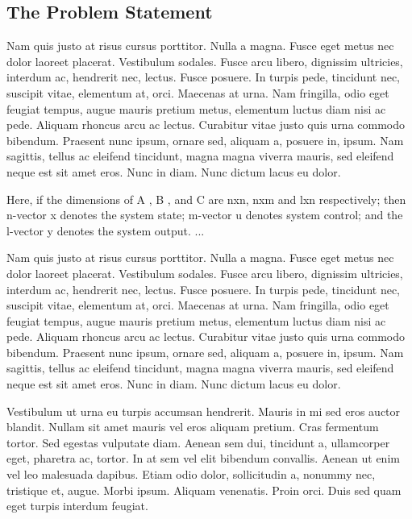 \subsection{The Problem Statement}    

Nam quis justo at risus cursus porttitor. Nulla a magna. Fusce eget metus nec dolor laoreet placerat. Vestibulum sodales. Fusce arcu libero, dignissim ultricies, interdum ac, hendrerit nec, lectus. Fusce posuere. In turpis pede, tincidunt nec, suscipit vitae, elementum at, orci. Maecenas at urna. Nam fringilla, odio eget feugiat tempus, augue mauris pretium metus, elementum luctus diam nisi ac pede. Aliquam rhoncus arcu ac lectus. Curabitur vitae justo quis urna commodo bibendum. Praesent nunc ipsum, ornare sed, aliquam a, posuere in, ipsum. Nam sagittis, tellus ac eleifend tincidunt, magna magna viverra mauris, sed eleifend neque est sit amet eros. Nunc in diam. Nunc dictum lacus eu dolor.

Here, if the dimensions of A  , B  , and C   are nxn, nxm and lxn   respectively; then n-vector x denotes the system state; m-vector u denotes system control; and the l-vector y denotes the system output. ... 

Nam quis justo at risus cursus porttitor. Nulla a magna. Fusce eget metus nec dolor laoreet placerat. Vestibulum sodales. Fusce arcu libero, dignissim ultricies, interdum ac, hendrerit nec, lectus. Fusce posuere. In turpis pede, tincidunt nec, suscipit vitae, elementum at, orci. Maecenas at urna. Nam fringilla, odio eget feugiat tempus, augue mauris pretium metus, elementum luctus diam nisi ac pede. Aliquam rhoncus arcu ac lectus. Curabitur vitae justo quis urna commodo bibendum. Praesent nunc ipsum, ornare sed, aliquam a, posuere in, ipsum. Nam sagittis, tellus ac eleifend tincidunt, magna magna viverra mauris, sed eleifend neque est sit amet eros. Nunc in diam. Nunc dictum lacus eu dolor.


Vestibulum ut urna eu turpis accumsan hendrerit. Mauris in mi sed eros auctor blandit. Nullam sit amet mauris vel eros aliquam pretium. Cras fermentum tortor. Sed egestas vulputate diam. Aenean sem dui, tincidunt a, ullamcorper eget, pharetra ac, tortor. In at sem vel elit bibendum convallis. Aenean ut enim vel leo malesuada dapibus. Etiam odio dolor, sollicitudin a, nonummy nec, tristique et, augue. Morbi ipsum. Aliquam venenatis. Proin orci. Duis sed quam eget turpis interdum feugiat.

